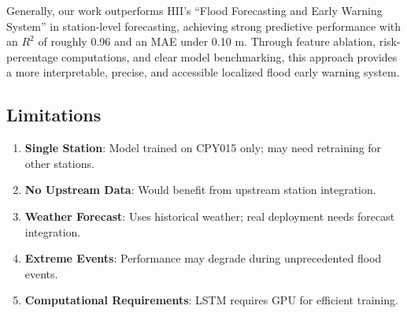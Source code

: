 Generally, our work outperforms HII's ``Flood Forecasting and Early Warning System'' in station-level forecasting, achieving strong predictive performance with an $R^2$ of roughly 0.96 and an MAE under 0.10 m. Through feature ablation, risk-percentage computations, and clear model benchmarking, this approach provides a more interpretable, precise, and accessible localized flood early warning system.

\subsection{Limitations}
\begin{enumerate}
    \item \textbf{Single Station}: Model trained on CPY015 only; may need retraining for other stations.
    \item \textbf{No Upstream Data}: Would benefit from upstream station integration.
    \item \textbf{Weather Forecast}: Uses historical weather; real deployment needs forecast integration.
    \item \textbf{Extreme Events}: Performance may degrade during unprecedented flood events.
    \item \textbf{Computational Requirements}: LSTM requires GPU for efficient training.
\end{enumerate}

